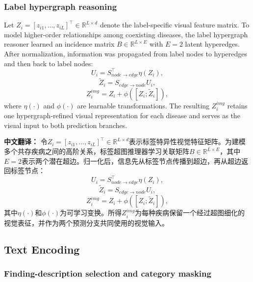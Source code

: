 \documentclass[Afour,sagev,times]{sagej}
\begin{document}
\subsubsection{Label hypergraph reasoning}

Let $Z_i=[z_{i1},\ldots,z_{iL}]^{\top}\in\mathbb{R}^{L\times d}$ denote the label-specific visual feature matrix. To model higher-order relationships among coexisting diseases, the label hypergraph reasoner learned an incidence matrix $B\in\mathbb{R}^{L\times E}$ with $E=2$ latent hyperedges. After normalization, information was propagated from label nodes to hyperedges and then back to label nodes:
\begin{equation}
U_i=S_{node\rightarrow edge}^{\top}\eta(Z_i),
\end{equation}
\begin{equation}
\widetilde{Z}_i=S_{edge\rightarrow node}U_i,
\end{equation}
\begin{equation}
Z_i^{img}=Z_i+\phi([Z_i;\widetilde{Z}_i]),
\end{equation}
where $\eta(\cdot)$ and $\phi(\cdot)$ are learnable transformations. The resulting $Z_i^{img}$ retains one hypergraph-refined visual representation for each disease and serves as the visual input to both prediction branches.

\textbf{中文翻译：} 令$Z_i=[z_{i1},\ldots,z_{iL}]^{\top}\in\mathbb{R}^{L\times d}$表示标签特异性视觉特征矩阵。为建模多个共存疾病之间的高阶关系，标签超图推理器学习关联矩阵$B\in\mathbb{R}^{L\times E}$，其中$E=2$表示两个潜在超边。归一化后，信息先从标签节点传播到超边，再从超边返回标签节点：
\begin{equation}
U_i=S_{node\rightarrow edge}^{\top}\eta(Z_i),
\end{equation}
\begin{equation}
\widetilde{Z}_i=S_{edge\rightarrow node}U_i,
\end{equation}
\begin{equation}
Z_i^{img}=Z_i+\phi([Z_i;\widetilde{Z}_i]),
\end{equation}
其中$\eta(\cdot)$和$\phi(\cdot)$为可学习变换。所得$Z_i^{img}$为每种疾病保留一个经过超图细化的视觉表征，并作为两个预测分支共同使用的视觉输入。

\subsection{Text Encoding}

\subsubsection{Finding-description selection and category masking}
\end{document}
